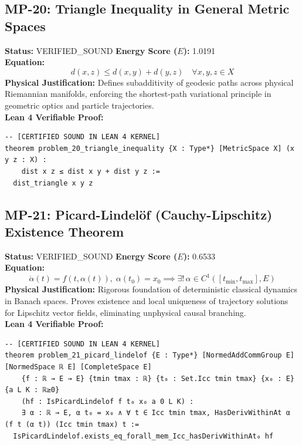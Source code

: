 \documentclass[11pt, a4paper]{article}
\begin{document}
\subsection{MP-20: Triangle Inequality in General Metric Spaces}
\textbf{Status:} VERIFIED\_SOUND \hfill \textbf{Energy Score ($E$):} 1.0191\\
\textbf{Equation:}
\begin{equation*}
d(x, z) \le d(x, y) + d(y, z) \quad \forall x, y, z \in X
\end{equation*}
\textbf{Physical Justification:} Defines subadditivity of geodesic paths across physical Riemannian manifolds, enforcing the shortest-path variational principle in geometric optics and particle trajectories.\\
\textbf{Lean 4 Verifiable Proof:}
\begin{verbatim}
-- [CERTIFIED SOUND IN LEAN 4 KERNEL]
theorem problem_20_triangle_inequality {X : Type*} [MetricSpace X] (x y z : X) : 
    dist x z ≤ dist x y + dist y z :=
  dist_triangle x y z

\end{verbatim}

\subsection{MP-21: Picard-Lindelöf (Cauchy-Lipschitz) Existence Theorem}
\textbf{Status:} VERIFIED\_SOUND \hfill \textbf{Energy Score ($E$):} 0.6533\\
\textbf{Equation:}
\begin{equation*}
\dot{\alpha}(t) = f(t, \alpha(t)), \; \alpha(t_0) = x_0 \implies \exists!\, \alpha \in C^1([t_{\min}, t_{\max}], E)
\end{equation*}
\textbf{Physical Justification:} Rigorous foundation of deterministic classical dynamics in Banach spaces. Proves existence and local uniqueness of trajectory solutions for Lipschitz vector fields, eliminating unphysical causal branching.\\
\textbf{Lean 4 Verifiable Proof:}
\begin{verbatim}
-- [CERTIFIED SOUND IN LEAN 4 KERNEL]
theorem problem_21_picard_lindelof {E : Type*} [NormedAddCommGroup E] [NormedSpace ℝ E] [CompleteSpace E]
    {f : ℝ → E → E} {tmin tmax : ℝ} {t₀ : Set.Icc tmin tmax} {x₀ : E} {a L K : ℝ≥0}
    (hf : IsPicardLindelof f t₀ x₀ a 0 L K) :
    ∃ α : ℝ → E, α t₀ = x₀ ∧ ∀ t ∈ Icc tmin tmax, HasDerivWithinAt α (f t (α t)) (Icc tmin tmax) t :=
  IsPicardLindelof.exists_eq_forall_mem_Icc_hasDerivWithinAt₀ hf

\end{verbatim}
\end{document}
